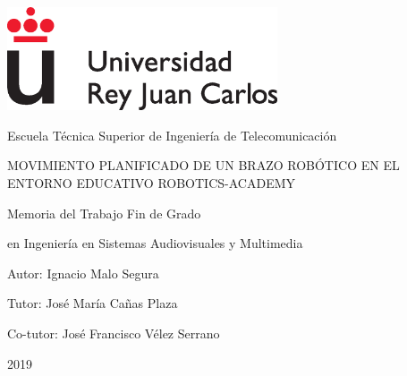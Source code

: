\documentclass[12pt,spanish,chapterprefix, numbers=noenddot]{book}
\numberwithin{equation}{section}
\numberwithin{figure}{section}
\begin{document}
\frontmatter

\begin{titlepage}

\begin{center}
\includegraphics[width=8cm]{Figs/logoURJC}
\par\end{center}

\begin{center}
Escuela Técnica Superior de Ingeniería de Telecomunicación
\par\end{center}

\vspace{4cm}

\begin{center}
{\LARGE{}MOVIMIENTO PLANIFICADO DE UN BRAZO ROBÓTICO 
EN EL ENTORNO EDUCATIVO ROBOTICS-ACADEMY}{\LARGE\par}
\par\end{center}

\vspace{4cm}

\begin{center}
{\large{}Memoria del Trabajo Fin de Grado}{\large\par}
\par\end{center}

\begin{center}
{\large{}en Ingeniería en Sistemas Audiovisuales y Multimedia}{\large\par}
\par\end{center}

\vspace{3cm}

\begin{center}
{\large{}Autor: Ignacio Malo Segura}{\large\par}
\par\end{center}

\begin{center}
{\large{}Tutor: José María Cañas Plaza}{\large\par}
\par\end{center}

\begin{center}
{\large{}Co-tutor: José Francisco Vélez Serrano}{\large\par}
\par\end{center}

\begin{center}
2019
\par\end{center}

\end{titlepage}
\end{document}
